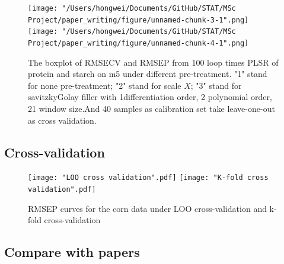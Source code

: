 \documentclass[a4paper,12pt,titlepage]{article} %
\numberwithin{equation}{section}  %
\begin{document}
	\begin{figure}[h]    %
		\centering           %
		\texttt{[image: "/Users/hongwei/Documents/GitHub/STAT/MSc Project/paper\_writing/figure/unnamed-chunk-3-1".png]}  %
		\texttt{[image: "/Users/hongwei/Documents/GitHub/STAT/MSc Project/paper\_writing/figure/unnamed-chunk-4-1".png]}  %
		\caption{The boxplot of RMSECV and RMSEP from 100 loop times PLSR of protein and starch on m5 under different pre-treatment. "1" stand for none pre-treatment; "2" stand for scale $X$; "3" stand for savitzkyGolay filler with 1differentiation order, 2 polynomial order, 21 window size.And 40 samples as calibration set take leave-one-out as cross validation.}          %
		\label{fig:pre-treatment-2}               %
	\end{figure}                        %
	
	\subsection{Cross-validation}
	\label{sec:Cross-Validation}
	
		\begin{figure}[h]    %
		\centering           %
		\texttt{[image: "LOO cross validation".pdf]}  %
		\texttt{[image: "K-fold cross validation".pdf]}  %
		\caption{RMSEP curves for the corn data under LOO cross-validation  and k-fold cross-validation}          %
		\label{fig:Cross-validation-1}               %
	\end{figure}                        %
	
	
	\subsection{Compare with papers}
	\label{sec:Compare with papers}
	
\end{document}

